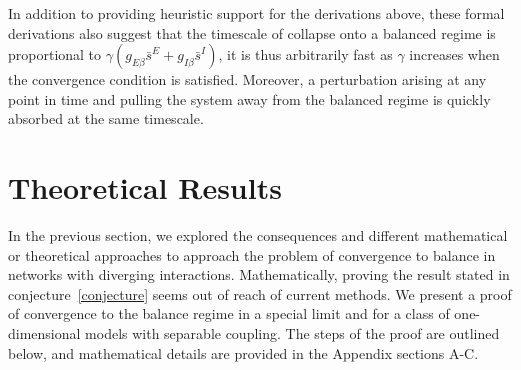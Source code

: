 \documentclass[onefignum,onetabnum]{siamart190516}
\newcommand{\1}{\mathbbm{1}}
\newcommand{\review}[1]{\textcolor{midblue}{ #1}}
\renewcommand{\review}[1]{{ #1}}
\begin{document}
	In addition to providing heuristic support for the derivations above, these formal derivations also suggest that the timescale of collapse onto a balanced regime is proportional to $\gamma (g_{E\beta} \bar{s}^E+g_{I\beta} \bar{s}^I)$, it is thus arbitrarily fast as $\gamma$ increases when the convergence condition is satisfied. Moreover, a perturbation arising at any point in time and pulling the system away from the balanced regime is quickly absorbed at the same timescale. 
	

\section{Theoretical Results}\label{sec:theory}
\review{In the previous section, we explored the consequences and different mathematical or theoretical approaches to approach the problem of convergence to balance in networks with diverging interactions. Mathematically, proving the result stated in conjecture~\ref{conjecture} seems out of reach of current methods. We present a proof of convergence to the balance regime in a special limit and for a class of one-dimensional models with separable coupling. The steps of the proof are outlined below, and mathematical details are provided in the Appendix sections A-C. }
\end{document}
